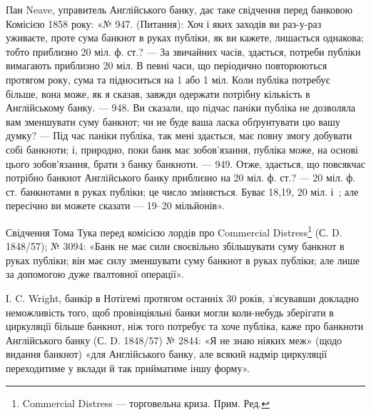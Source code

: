 
Пан Neave, управитель Англійського банку, дає таке свідчення перед
банковою Комісією 1858 року: «№ 947. (Питання): Хоч і яких заходів ви
раз-у-раз уживаєте, проте сума банкнот в руках публіки, як ви кажете,
лишається однакова; тобто приблизно 20 міл. ф. ст.? — За звичайних часів,
здається, потреби публіки вимагають приблизно 20 міл. В певні часи, що періодично
повторюються протягом року, сума та підноситься на 1 або 1 міл.
Коли публіка потребує більше, вона може, як я сказав, завжди одержати
потрібну кількість в Англійському банку. — 948. Ви сказали, що підчас паніки
публіка не дозволяла вам зменшувати суму банкнот; чи не буде ваша ласка
обґрунтувати цю вашу думку? — Під час паніки публіка, так мені здається, має
повну змогу добувати собі банкноти; і, природно, поки банк має зобов’язання,
публіка може, на основі цього зобов’язання, брати з банку банкноти. — 949.
Отже, здається, що повсякчас потрібно банкнот Англійського банку приблизно
на 20 міл. ф. ст.? — 20 міл. ф. ст. банкнотами в руках публіки; це число
зміняється. Буває 18,19, 20 міл. і~; але пересічно ви можете сказати —
19--20 мільйонів».

Свідчення Тома Тука перед комісією лордів про Commercial Distress\footnote*{
Commercial Distress — торговельна криза. Прим. Ред.
}
(С. D. 1848/57); № 3094: «Банк не має сили своєвільно збільшувати суму
банкнот в руках публіки; він має силу зменшувати суму банкнот в руках
публіки; але лише за допомогою дуже ґвалтовної операції».

І. C. Wright, банкір в Нотігемі протягом останніх 30 років, з’ясувавши
докладно неможливість того, щоб провінціяльні банки могли коли-небудь зберігати
в циркуляції більше банкнот, ніж того потребує та хоче публіка, каже про банкноти
Англійського банку (С. D. 1848/57) № 2844: «Я не знаю ніяких меж»
(щодо видання банкнот) «для Англійського банку, але всякий надмір циркуляції
переходитиме у вклади й так прийматиме іншу форму».

